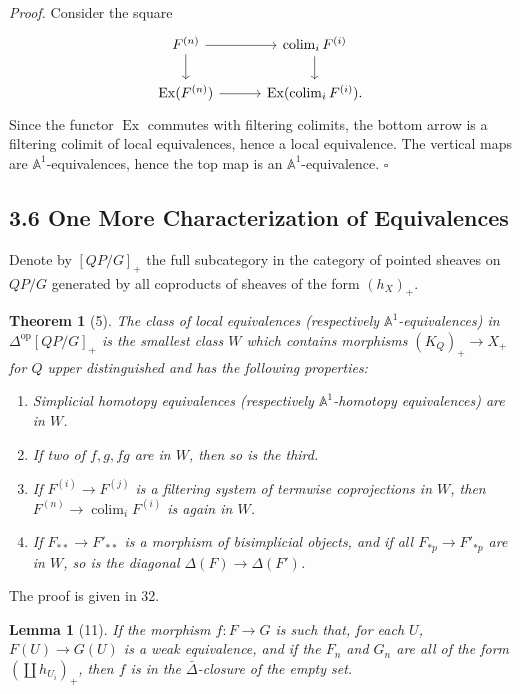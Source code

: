 \documentclass[11pt]{article}
\newcommand{\Aone}{\mathbb A^1}
\theoremstyle{deligne}
\newtheorem*{theorem*}{Theorem}
\newtheorem*{lemma*}{Lemma}
\newenvironment{proofdel}{\noindent\textit{Proof.}}{\hfill$\square$}
\newcommand{\colim}{\operatorname{colim}}
\newcommand{\op}{\mathrm{op}}
\newcommand{\Ex}{\operatorname{Ex}}
\begin{document}
\begin{proofdel}
Consider the square
\[
\begin{tikzcd}[column sep=3.0em,row sep=1.7em]
F^{(n)} \arrow[r] \arrow[d] & \colim_iF^{(i)} \arrow[d] \\
\Ex(F^{(n)}) \arrow[r] & \Ex(\colim_iF^{(i)}) .
\end{tikzcd}
\]
Since the functor \(\Ex\) commutes with filtering colimits, the bottom arrow is a filtering colimit of local equivalences, hence a local equivalence. The vertical maps are \(\Aone\)-equivalences, hence the top map is an \(\Aone\)-equivalence.
\end{proofdel}

\subsection*{3.6 One More Characterization of Equivalences}

Denote by \([QP/G]_+\) the full subcategory in the category of pointed sheaves on \(QP/G\) generated by all coproducts of sheaves of the form \((h_X)_+\).

\begin{theorem*}[5]
The class of local equivalences (respectively \(\Aone\)-equivalences) in \(\Delta^{\op}[QP/G]_+\) is the smallest class \(W\) which contains morphisms \((K_Q)_+\to X_+\) for \(Q\) upper distinguished and has the following properties:
\begin{enumerate}[label=\arabic*.]
\item Simplicial homotopy equivalences (respectively \(\Aone\)-homotopy equivalences) are in \(W\).
\item If two of \(f,g,fg\) are in \(W\), then so is the third.
\item If \(F^{(i)}\to F^{(j)}\) is a filtering system of termwise coprojections in \(W\), then \(F^{(n)}\to\colim_iF^{(i)}\) is again in \(W\).
\item If \(F_{**}\to F'_{**}\) is a morphism of bisimplicial objects, and if all \(F_{*p}\to F'_{*p}\) are in \(W\), so is the diagonal \(\Delta(F)\to\Delta(F')\).
\end{enumerate}
\end{theorem*}

The proof is given in 32.

\begin{lemma*}[11]
If the morphism \(f:F\to G\) is such that, for each \(U\), \(F(U)\to G(U)\) is a weak equivalence, and if the \(F_n\) and \(G_n\) are all of the form \((\coprod h_{U_i})_+\), then \(f\) is in the \(\bar\Delta\)-closure of the empty set.
\end{lemma*}
\end{document}
